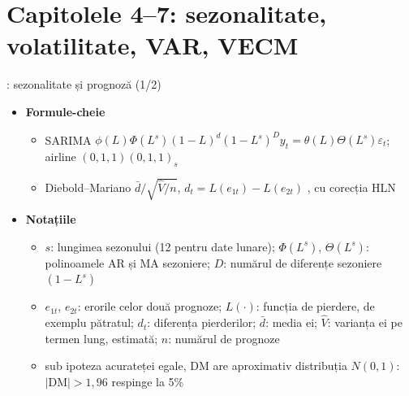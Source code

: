 \section{Capitolele 4--7: sezonalitate, volatilitate, VAR, VECM}

\begin{frame}{: sezonalitate și prognoză (1/2)}
\itemsize{\footnotesize}
\begin{itemize}
    \item \textbf{Formule-cheie}
    \begin{itemize}
        \item SARIMA $\phi(L)\Phi(L^s)(1 - L)^d(1 - L^s)^D y_t = \theta(L)\Theta(L^s)\varepsilon_t$; airline $(0,1,1)(0,1,1)_s$
        \item Diebold--Mariano $\bar d/\sqrt{\hat V/n}$, $d_t = L(e_{1t}) - L(e_{2t})$ , cu corecția HLN 
    \end{itemize}
    \item \textbf{Notațiile}
    \begin{itemize}
        \item $s$: lungimea sezonului (12 pentru date lunare); $\Phi(L^s)$, $\Theta(L^s)$: polinoamele AR și MA sezoniere; $D$: numărul de diferențe sezoniere $(1 - L^s)$
        \item $e_{1t}$, $e_{2t}$: erorile celor două prognoze; $L(\cdot)$: funcția de pierdere, de exemplu pătratul; $d_t$: diferența pierderilor; $\bar d$: media ei; $\hat V$: varianța ei pe termen lung, estimată; $n$: numărul de prognoze
        \item sub ipoteza acurateței egale, DM are aproximativ distribuția $N(0, 1)$: $|\mathrm{DM}| > 1{,}96$ respinge la 5\%
    \end{itemize}
\end{itemize}
\end{frame}

